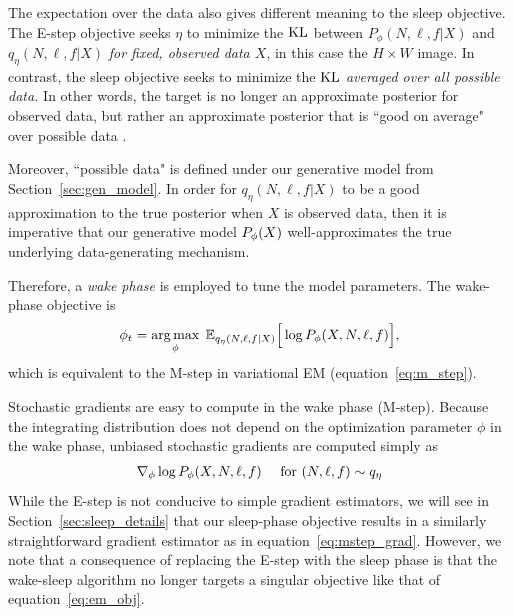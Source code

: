 The expectation over the data also gives different meaning to the sleep objective. The E-step objective seeks $\eta$ to minimize the $\textrm{KL}$ between $P_\phi(N, \ell, f | X)$ and $q_\eta(N, \ell, f | X)$ {\itshape for fixed, observed data $X$},
in this case the $H\times W$ image. In contrast, the sleep objective seeks to minimize the $\textrm{KL}$ {\itshape averaged over all possible data. } In other words, the target is no longer an approximate posterior for observed data, but rather an approximate posterior that is ``good on average" over possible data .

Moreover, ``possible data" is defined under our generative model from Section~\ref{sec:gen_model}. In order for $q_\eta(N, \ell, f | X)$ to be a good approximation to
the true posterior when $X$ is observed data, then it is imperative that our generative model $P_\phi(X)$ well-approximates the true underlying data-generating mechanism. 

Therefore, a {\itshape wake phase} is employed to tune the model parameters. The wake-phase objective is
\begin{align}
    \phi_{t} = \operatorname*{arg\,max}_{\phi} \; \mathbb{E}_{q_{\eta}(N, \ell, f | X)}\Big[\log P_\phi(X, N, \ell, f)\Big], 
    \label{eq:wake_elbo}
\end{align}
which is equivalent to the M-step in variational EM (equation~\ref{eq:m_step}). 

Stochastic gradients are easy to compute in the wake phase (M-step). Because the integrating distribution does not depend on the optimization parameter $\phi$ in the wake phase, unbiased stochastic gradients are computed simply as 
\begin{align}
    \nabla_\phi \log P_\phi(X, N, \ell, f) \quad \text{ for } (N, \ell, f)\sim q_\eta
    \label{eq:mstep_grad}
\end{align}
While the E-step is not conducive to simple gradient estimators, we will see in Section~\ref{sec:sleep_details} that our sleep-phase objective
results in a similarly straightforward gradient estimator as in equation~\eqref{eq:mstep_grad}. However,
we note that a consequence of replacing the E-step with the sleep phase is that the wake-sleep algorithm no longer targets a singular objective like that of equation~\eqref{eq:em_obj}. 



